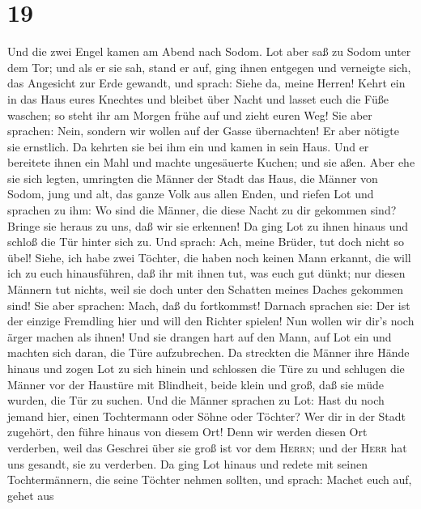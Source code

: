 \hypertarget{section-18}{%
\section{19}\label{section-18}}

 Und die zwei Engel kamen am Abend nach Sodom. Lot aber
saß zu Sodom unter dem Tor; und als er sie sah, stand er auf, ging ihnen
entgegen und verneigte sich, das Angesicht zur Erde gewandt,
 und sprach: Siehe da, meine Herren! Kehrt ein in das Haus
eures Knechtes und bleibet über Nacht und lasset euch die Füße waschen;
so steht ihr am Morgen frühe auf und zieht euren Weg! Sie aber sprachen:
Nein, sondern wir wollen auf der Gasse übernachten!  Er
aber nötigte sie ernstlich. Da kehrten sie bei ihm ein und kamen in sein
Haus. Und er bereitete ihnen ein Mahl und machte ungesäuerte Kuchen; und
sie aßen.  Aber ehe sie sich legten, umringten die Männer
der Stadt das Haus, die Männer von Sodom, jung und alt, das ganze Volk
aus allen Enden,  und riefen Lot und sprachen zu ihm: Wo
sind die Männer, die diese Nacht zu dir gekommen sind? Bringe sie heraus
zu uns, daß wir sie erkennen!  Da ging Lot zu ihnen hinaus
und schloß die Tür hinter sich zu.  Und sprach: Ach, meine
Brüder, tut doch nicht so übel!  Siehe, ich habe zwei
Töchter, die haben noch keinen Mann erkannt, die will ich zu euch
hinausführen, daß ihr mit ihnen tut, was euch gut dünkt; nur diesen
Männern tut nichts, weil sie doch unter den Schatten meines Daches
gekommen sind!  Sie aber sprachen: Mach, daß du
fortkommst! Darnach sprachen sie: Der ist der einzige Fremdling hier und
will den Richter spielen! Nun wollen wir dir's noch ärger machen als
ihnen! Und sie drangen hart auf den Mann, auf Lot ein und machten sich
daran, die Türe aufzubrechen.  Da streckten die Männer
ihre Hände hinaus und zogen Lot zu sich hinein und schlossen die Türe zu
 und schlugen die Männer vor der Haustüre mit Blindheit,
beide klein und groß, daß sie müde wurden, die Tür zu suchen.
 Und die Männer sprachen zu Lot: Hast du noch jemand
hier, einen Tochtermann oder Söhne oder Töchter? Wer dir in der Stadt
zugehört, den führe hinaus von diesem Ort!  Denn wir
werden diesen Ort verderben, weil das Geschrei über sie groß ist vor dem
\textsc{Herrn}; und der \textsc{Herr} hat uns gesandt, sie zu verderben.
 Da ging Lot hinaus und redete mit seinen Tochtermännern,
die seine Töchter nehmen sollten, und sprach: Machet euch auf, gehet aus
